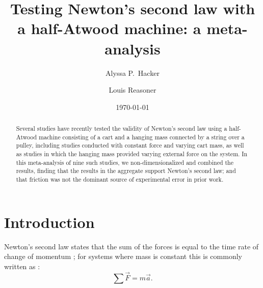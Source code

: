 \documentclass[reprint,amsmath,amssymb,aps,twoside]{revtex4-2}
\begin{document}
\setcounter{page}{33}
\title{Testing Newton's second law with a half-Atwood machine: a meta-analysis}

\author{Alyssa P.~Hacker}
\author{Louis Reasoner}
\date{\today}

\begin{abstract}
Several studies have recently tested the validity of Newton's second law using a half-Atwood machine consisting of a cart and a hanging mass connected by a string over a pulley, including studies conducted with constant force and varying cart mass, as well as studies in which the hanging mass provided varying external force on the system. In this meta-analysis of nine such studies, we non-dimensionalized and combined the results, finding that the results in the aggregate support Newton's second law; and that friction was not the dominant source of experimental error in prior work. 
\end{abstract}


\maketitle\thispagestyle{mytitlepage}





\section{Introduction}
Newton's second law states that the sum of the forces is equal to the time rate of change of momentum \cite{newton1687principia}; for systems where mass is constant this is commonly written as \cite{tipler, barrons}:
\begin{equation}
\sum\vec{F} = m\vec{a}.
\label{eq:n2l}
\end{equation}
\end{document}
